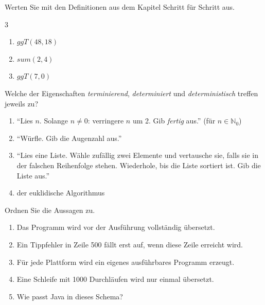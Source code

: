 Werten Sie mit den Definitionen aus dem Kapitel Schritt für Schritt aus.
\begin{multicols}{3}
\begin{enumerate}[label=\alph*)]
\item $\mathit{ggT}(48, 18)$
\item $\mathit{sum}(2, 4)$
\item $\mathit{ggT}(7, 0)$
\end{enumerate}
\end{multicols}

Welche der Eigenschaften \emph{terminierend}, \emph{determiniert} und \emph{deterministisch} treffen jeweils zu?
\begin{enumerate}[label=\alph*)]
\item \enquote{Lies $n$. Solange $n \neq 0$: verringere $n$ um 2. Gib \emph{fertig} aus.} (für $n \in \mathbb{N}_0$)
\item \enquote{Würfle. Gib die Augenzahl aus.}
\item \enquote{Lies eine Liste. Wähle zufällig zwei Elemente und vertausche sie, falls sie in der falschen Reihenfolge stehen. Wiederhole, bis die Liste sortiert ist. Gib die Liste aus.}
\item der euklidische Algorithmus
\end{enumerate}

Ordnen Sie die Aussagen zu.
\begin{enumerate}[label=\alph*)]
\item Das Programm wird vor der Ausführung vollständig übersetzt.
\item Ein Tippfehler in Zeile 500 fällt erst auf, wenn diese Zeile erreicht wird.
\item Für jede Plattform wird ein eigenes ausführbares Programm erzeugt.
\item Eine Schleife mit 1000 Durchläufen wird nur einmal übersetzt.
\item Wie passt Java in dieses Schema?
\end{enumerate}
